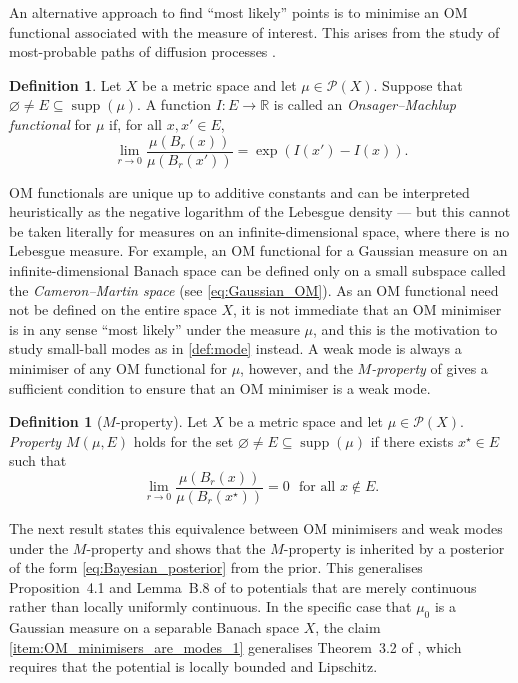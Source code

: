 \documentclass[11pt]{article}
\newcommand*{\cball}[2]{B_{#2}(#1)}
\newcommand*{\defterm}{\emph}%
\newcommand*{\prob}[1]{\mathscr{P}(#1)}
\newcommand*{\Reals}{\mathbb{R}}
\DeclareMathOperator*{\supp}{supp}
\renewcommand*{\emptyset}{\varnothing}
\newcommand*{\crcdf}[2]{\mu(\cball{#1}{#2})}
\theoremstyle{plain}
\theoremstyle{definition}
\newtheorem{definition}[theorem]{Definition}
\numberwithin{equation}{section}
\numberwithin{figure}{section}
\numberwithin{table}{section}
\begin{document}
An alternative approach to find ``most likely'' points is to minimise an OM functional associated with the measure of interest. This arises from the study of most-probable paths of diffusion processes \citep{DuerrBach1978}.

\begin{definition}
	\label{def:OM_functional}
	Let $X$ be a metric space and let $\mu \in \prob{X}$.
	Suppose that $\emptyset \neq E \subseteq \supp(\mu)$.
	A function $I \colon E \to \Reals$ is called an \defterm{Onsager--Machlup functional} for $\mu$ if, for all $x, x' \in E$,
	\begin{equation*}
		\lim_{r \to 0} \frac{\crcdf{x}{r}}{\crcdf{x'}{r}} = \exp\left(I(x') - I(x)\right).
	\end{equation*}
\end{definition}

OM functionals are unique up to additive constants and can be interpreted heuristically as the negative logarithm of the Lebesgue density --- but this cannot be taken literally for measures on an infinite-dimensional space, where there is no Lebesgue measure.
For example, an OM functional for a Gaussian measure on an infinite-dimensional Banach space can be defined only on a small subspace called the \emph{Cameron--Martin space} (see \eqref{eq:Gaussian_OM}).
As an OM functional need not be defined on the entire space $X$, it is not immediate that an OM minimiser is in any sense ``most likely'' under the measure $\mu$, and this is the motivation to study small-ball modes as in \cref{def:mode} instead.
A weak mode is always a minimiser of any OM functional for $\mu$, however, and the \emph{$M$-property} of \citet{AyanbayevKlebanovLieSullivan2022a} gives a sufficient condition to ensure that an OM minimiser is a weak mode.

\begin{definition}[$M$-property]
	Let $X$ be a metric space and let $\mu \in \prob{X}$.
	\emph{Property $M(\mu, E)$} holds for the set $\emptyset \neq E \subseteq \supp(\mu)$ if there exists $x^{\star} \in E$ such that
	\begin{equation*}
		\lim_{r \to 0} \frac{\crcdf{x}{r}}{\crcdf{x^{\star}}{r}} = 0 \text{~~for all $x \notin E$.}
	\end{equation*}
\end{definition}

The next result states this equivalence between OM minimisers and weak modes under the $M$-property and shows that the $M$-property is inherited by a posterior of the form \eqref{eq:Bayesian_posterior} from the prior. 
This generalises Proposition~4.1 and Lemma~B.8 of \citet{AyanbayevKlebanovLieSullivan2022a} to potentials that are merely continuous rather than locally uniformly continuous.
In the specific case that $\mu_{0}$ is a Gaussian measure on a separable Banach space $X$, the claim \ref{item:OM_minimisers_are_modes_1} generalises Theorem~3.2 of \citet{DashtiLawStuartVoss2013}, which requires that the potential is locally bounded and Lipschitz.
\end{document}
